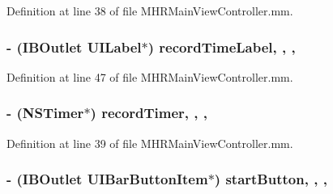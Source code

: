 Definition at line 38 of file M\+H\+R\+Main\+View\+Controller.\+mm.

\hypertarget{category_m_h_r_main_view_controller_07_08_a63bbbfafd497288fe3035250ab5d9fcb}{
\subsubsection[{record\+Time\+Label}]{\setlength{\rightskip}{0pt plus 5cm}-\/ (I\+B\+Outlet U\+I\+Label$\ast$) record\+Time\+Label\hspace{0.3cm}{\ttfamily [read]}, {\ttfamily [write]}, {\ttfamily [nonatomic]}, {\ttfamily [weak]}}}\label{category_m_h_r_main_view_controller_07_08_a63bbbfafd497288fe3035250ab5d9fcb}


Definition at line 47 of file M\+H\+R\+Main\+View\+Controller.\+mm.

\hypertarget{category_m_h_r_main_view_controller_07_08_a1f1639552968eeba13ed2b4575bea129}{
\subsubsection[{record\+Timer}]{\setlength{\rightskip}{0pt plus 5cm}-\/ (N\+S\+Timer$\ast$) record\+Timer\hspace{0.3cm}{\ttfamily [read]}, {\ttfamily [write]}, {\ttfamily [nonatomic]}, {\ttfamily [strong]}}}\label{category_m_h_r_main_view_controller_07_08_a1f1639552968eeba13ed2b4575bea129}


Definition at line 39 of file M\+H\+R\+Main\+View\+Controller.\+mm.

\hypertarget{category_m_h_r_main_view_controller_07_08_a98273435af4fbcd1e437f257bb9ced12}{
\subsubsection[{start\+Button}]{\setlength{\rightskip}{0pt plus 5cm}-\/ (I\+B\+Outlet U\+I\+Bar\+Button\+Item$\ast$) start\+Button\hspace{0.3cm}{\ttfamily [read]}, {\ttfamily [write]}, {\ttfamily [nonatomic]}, {\ttfamily [strong]}}}\label{category_m_h_r_main_view_controller_07_08_a98273435af4fbcd1e437f257bb9ced12}


